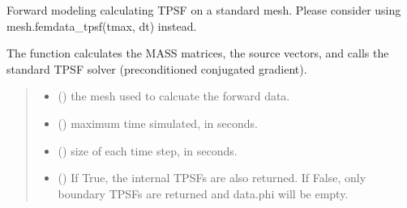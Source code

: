 \documentclass[letterpaper,10pt,english]{sphinxmanual}
\begin{document}
\begin{fulllineitems}
\label{\detokenize{_autosummary/nirfasterff.forward.femdata.femdata_stnd_TR:nirfasterff.forward.femdata.femdata_stnd_TR}}
\pysigstartsignatures
\pysiglinewithargsret
{}
{\sphinxparamcomma {}\sphinxparamcomma {}\sphinxparamcomma {}\sphinxparamcomma {}\sphinxparamcomma {}\sphinxparamcomma {}}
{}
\pysigstopsignatures
\sphinxAtStartPar
Forward modeling calculating TPSF on a standard mesh. Please consider using mesh.femdata\_tpsf(tmax, dt) instead.

\sphinxAtStartPar
The function calculates the MASS matrices, the source vectors, and calls the standard TPSF solver (preconditioned conjugated gradient).
\begin{quote}\begin{description}
\begin{itemize}
\item {} 
\sphinxAtStartPar
{} () \textendash{} the mesh used to calcuate the forward data.

\item {} 
\sphinxAtStartPar
{} () \textendash{} maximum time simulated, in seconds.

\item {} 
\sphinxAtStartPar
{} () \textendash{} size of each time step, in seconds.

\item {} 
\sphinxAtStartPar
{} (\sphinxstyleliteralemphasis{\sphinxupquote{, }}) \textendash{} 
\sphinxAtStartPar
If True, the internal TPSFs are also returned. If False, only boundary TPSFs are returned and data.phi will be empty.


\end{itemize}
\end{description}
\end{quote}
\end{fulllineitems}
\end{document}
